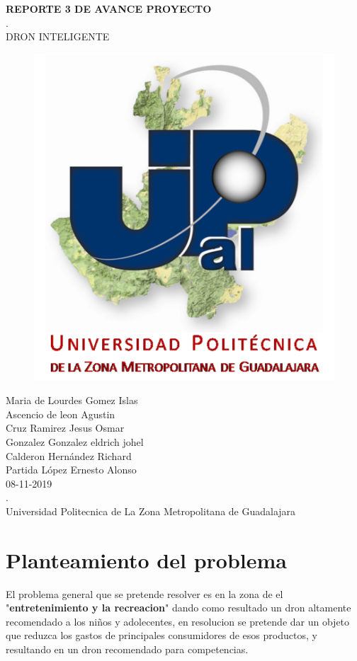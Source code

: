 \documentclass[11pt,a4paper]{article}
\begin{document}
\begin{center}
\textbf{REPORTE 3 DE AVANCE PROYECTO}\\
.\\
DRON INTELIGENTE
\end{center}

\begin{figure}[h]
\centering
\includegraphics[width=13cm]{upzmg}
\end{figure}

\begin{center}
Maria de Lourdes Gomez Islas\\
Ascencio de leon Agustin\\
Cruz Ramirez Jesus Osmar\\
Gonzalez Gonzalez eldrich johel\\
Calderon Hernández Richard\\
Partida López Ernesto Alonso\\
08-11-2019\\
.\\
Universidad Politecnica de La Zona Metropolitana de Guadalajara
\end{center}

\newpage 

\part{Planteamiento del problema}
El problema general que se pretende resolver es en la zona de el "\textbf{entretenimiento y la recreacion}" dando como resultado un dron altamente recomendado a los niños y adolecentes, en resolucion se pretende dar un objeto que reduzca los gastos de principales consumidores de esos productos, y resultando en un dron recomendado para competencias.
 
\end{document}
